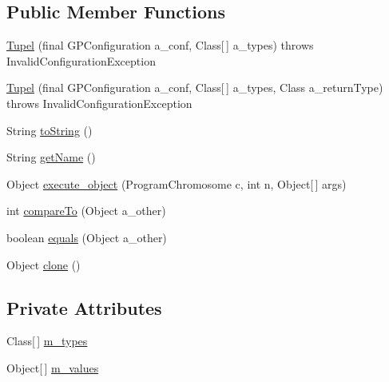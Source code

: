 \subsection*{Public Member Functions}
\begin{DoxyCompactItemize}
\item 
\hyperlink{classorg_1_1jgap_1_1gp_1_1function_1_1_tupel_a6c4b5a973eed8f4aba995093e23ca388}{Tupel} (final G\-P\-Configuration a\-\_\-conf, Class\mbox{[}$\,$\mbox{]} a\-\_\-types)  throws Invalid\-Configuration\-Exception 
\item 
\hyperlink{classorg_1_1jgap_1_1gp_1_1function_1_1_tupel_a9e424b57f2d3ee51846c7dd47298f61b}{Tupel} (final G\-P\-Configuration a\-\_\-conf, Class\mbox{[}$\,$\mbox{]} a\-\_\-types, Class a\-\_\-return\-Type)  throws Invalid\-Configuration\-Exception 
\item 
String \hyperlink{classorg_1_1jgap_1_1gp_1_1function_1_1_tupel_a3863fe23be07bb1c648c9306059dcd2d}{to\-String} ()
\item 
String \hyperlink{classorg_1_1jgap_1_1gp_1_1function_1_1_tupel_ad3581383cb6036d1d88658201adf30ef}{get\-Name} ()
\item 
Object \hyperlink{classorg_1_1jgap_1_1gp_1_1function_1_1_tupel_aed5c24f41ea359ff1788cb932eac2f3b}{execute\-\_\-object} (Program\-Chromosome c, int n, Object\mbox{[}$\,$\mbox{]} args)
\item 
int \hyperlink{classorg_1_1jgap_1_1gp_1_1function_1_1_tupel_a64feb3f14b91cfc99ab0d2f49c2d052b}{compare\-To} (Object a\-\_\-other)
\item 
boolean \hyperlink{classorg_1_1jgap_1_1gp_1_1function_1_1_tupel_a9e57dcc37967b38c9e8eae3f03486e79}{equals} (Object a\-\_\-other)
\item 
Object \hyperlink{classorg_1_1jgap_1_1gp_1_1function_1_1_tupel_a424b47e0e287b0a9a1ec261539b12fca}{clone} ()
\end{DoxyCompactItemize}
\subsection*{Private Attributes}
\begin{DoxyCompactItemize}
\item 
Class\mbox{[}$\,$\mbox{]} \hyperlink{classorg_1_1jgap_1_1gp_1_1function_1_1_tupel_a59be45cfe4882514ab8a66041bbf08f8}{m\-\_\-types}
\item 
Object\mbox{[}$\,$\mbox{]} \hyperlink{classorg_1_1jgap_1_1gp_1_1function_1_1_tupel_a35cef8da31159b4f460ebe12c83d16e8}{m\-\_\-values}
\end{DoxyCompactItemize}
